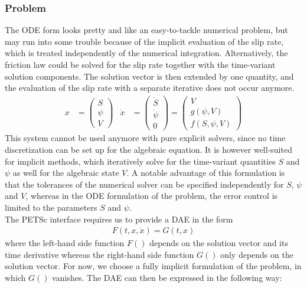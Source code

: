 \subsubsection{Problem}
The ODE form looks pretty and like an easy-to-tackle numerical problem, but may run into some trouble because of the implicit evaluation of the slip rate, which is treated independently of the numerical integration. Alternatively, the friction law could be solved for the slip rate together with the time-variant solution components. The solution vector is then extended by one quantity, and the evaluation of the slip rate with a separate iterative does not occur anymore.
\begin{align}
	\label{eq:DAE_formulation_SEAS}
	x &= \begin{pmatrix}
			S \\ \psi \\ V
		 \end{pmatrix} & \dot{x} &= \begin{pmatrix}
										\dot{S} \\ \dot{\psi} \\ 0
									\end{pmatrix} = \begin{pmatrix}
										V \\ g(\psi, V) \\ f(S,\psi,V)
									\end{pmatrix}
\end{align}
This system cannot be used anymore with pure explicit solvers, since no time discretization can be set up for the algebraic equation. It is however well-suited for implicit methods, which iteratively solve for the time-variant quantities $S$ and $\psi$ as well for the algebraic state $V$. A notable advantage of this formulation is that the tolerances of the numerical solver can be specified independently for $S$, $\psi$ and $V$, whereas in the ODE formulation of the problem, the error control is limited to the parameters $S$ and $\psi$. \\
The PETSc interface requires us to provide a DAE in the form
\begin{align}
	F(t, x,\dot{x}) = G(t,x) 
\end{align}
where the left-hand side function $F()$ depends on the solution vector and its time derivative whereas the right-hand side function $G()$ only depends on the solution vector. For now, we choose a fully implicit formulation of the problem, in which $G()$ vanishes. The DAE can then be expressed in the following way: 

